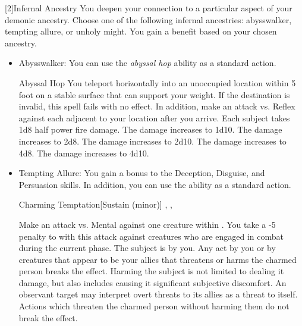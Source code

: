             [2]{Infernal Ancestry} You deepen your connection to a particular aspect of your demonic ancestry.
            Choose one of the following infernal ancestries: abysswalker, tempting allure, or unholy might.
            You gain a benefit based on your chosen ancestry.
            \begin{itemize}
                \item Abysswalker: You can use the \textit{abyssal hop} ability as a standard action.
                    \begin{freeability}{Abyssal Hop}
                        \rankline
                        You teleport horizontally into an unoccupied location within 5 foot  on a stable surface that can support your weight.
                        If the destination is invalid, this spell fails with no effect.
                        In addition, make an attack vs. Reflex against each  adjacent to your location after you arrive.
                        \hit Each subject takes 1d8 \add half power fire damage.
                        \rankline
                         The damage increases to 1d10.
                         The damage increases to 2d8.
                         The damage increases to 2d10.
                         The damage increases to 4d8.
                         The damage increases to 4d10.
                    \end{freeability}
                \item Tempting Allure: You gain a  bonus to the Deception, Disguise, and Persuasion skills.
                    In addition, you can use the  ability as a standard action.
                    \begin{durationability}{Charming Temptation}[Sustain (minor)]
                        , , 
                        \rankline
                        \noindent

                        Make an attack vs. Mental against one creature within \medrange.
                        You take a -5 penalty to  with this attack against creatures who are engaged in combat during the current phase.%
                        \vspace{0.25em}
                        \hit The subject is \charmed by you.
                        Any act by you or by creatures that appear to be your allies that threatens or harms the charmed person breaks the effect.
                        Harming the subject is not limited to dealing it damage, but also includes causing it significant subjective discomfort.
                        An observant target may interpret overt threats to its allies as a threat to itself.
                        \crit Actions which threaten the charmed person without harming them do not break the effect.


\end{durationability}
\end{itemize}

